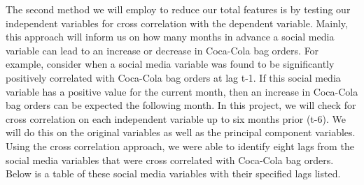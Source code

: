 \documentclass[12pt,oneside]{chicagocapstone}
\begin{document}
The second method we will employ to reduce our total features is by
testing our independent variables for cross correlation with the
dependent variable. Mainly, this approach will inform us on how many
months in advance a social media variable can lead to an increase or
decrease in Coca-Cola bag orders. For example, consider when a social
media variable was found to be significantly positively correlated with
Coca-Cola bag orders at lag t-1. If this social media variable has a
positive value for the current month, then an increase in Coca-Cola bag
orders can be expected the following month. In this project, we will
check for cross correlation on each independent variable up to six
months prior (t-6). We will do this on the original variables as well as
the principal component variables. Using the cross correlation approach,
we were able to identify eight lags from the social media variables that
were cross correlated with Coca-Cola bag orders. Below is a table of
these social media variables with their specified lags listed.
\end{document}
